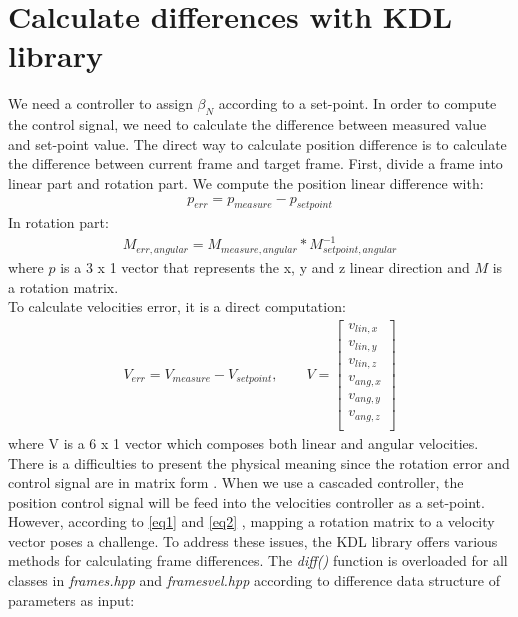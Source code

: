 \documentclass[report.tex]{subfiles}
\begin{document}
    \section{Calculate differences with KDL library}
    We need a controller to assign $\beta_N$ according to a set-point. In order to compute the control signal, we need to calculate the difference between measured value and set-point value. The direct way to calculate position difference is to calculate the difference between current frame and target frame. First, divide a frame into linear part and rotation part. We compute the position linear difference with:
    \begin{align}
        p_{err} = p_{measure}-p_{setpoint}
    \end{align}
    In rotation part:
    \begin{align}
        M_{err,angular} = M_{measure,angular}*M_{setpoint,angular}^{-1}
        \label{eq1}
    \end{align}
    where $p$ is a 3 x 1 vector that represents the x, y and z linear direction and $M$ is a rotation matrix. \\
    To calculate velocities error, it is a direct computation:
    \begin{align}
        V_{err} = V_{measure}-V_{setpoint} ,\qquad V = \begin{bmatrix}
            v_{lin,x}\\
            v_{lin,y}\\
            v_{lin,z}\\
            v_{ang,x}\\
            v_{ang,y}\\
            v_{ang,z}\\ 
        \end{bmatrix} 
        \label{eq2}
    \end{align}
    where V is a 6 x 1 vector which composes both linear and angular velocities.\\
    There is a difficulties to present the physical meaning since the rotation error and control signal are in matrix form . When we use a cascaded controller, the position control signal will be feed into the velocities controller as a set-point. However, according to \ref{eq1} and \ref{eq2} , mapping a rotation matrix to a velocity vector poses a challenge. To address these issues, the KDL library offers various methods for calculating frame differences. The \textit{diff()} function is overloaded for all classes in \textit{frames.hpp} and \textit{framesvel.hpp} according to difference data structure of parameters as input:
\end{document}

